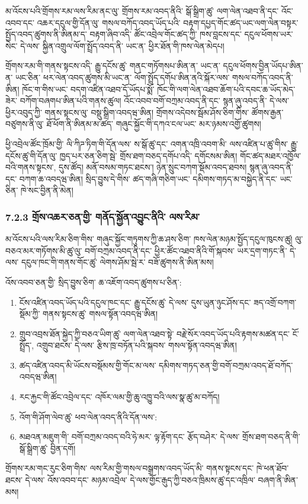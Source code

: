 \documentclass[11pt]{article}
\begin{document}
མ་འོངས་པའི་གྲོགས་རམ་ལས་རིམ་ནང་ལུ་ གྲོགས་རམ་འབད་ནིའི་ སྒོ་སྒྲིག་ཚུ་ ལག་ལེན་འཐབ་ནི་དང་ འོང་འབབ་དང་ འཆར་དངུལ་གྱི་དོན་ལུ་ གསལ་བཀོད་འབད་ཡོད་པའི་ བརྟག་དཔྱད་གོང་ཚད་ཡང་ལག་ལེན་བསྟར་སྤྱོད་འབད་ཚུགས་ནི་ཨིནམ་ད་ བརྟག་ཞིབ་འདི་ ཚོང་འབྲེལ་གོང་ཚད་ཀྱི་ ཁས་བླངས་དང་ དངུལ་ཕོགས་ཡར་སེང་ དེ་ལས་ སྐྱིན་འགྲུལ་ལོག་སྤྲོད་འབད་ནི་ ཡང་ན་ ཕྱིར་ཐོན་གི་ཁས་ལེན་མེདཔ།

གྲོགས་རམ་གི་གནས་སྟངས་འདི་ རྒྱུ་དངོས་ཚུ་ གནང་གཏོགསཔ་ཨིན་ན་ ཡང་ན་ དངུལ་ཕོགས་བྱིན་ཡོདཔ་ཨིན་ན་ ཡང་ཅིན་ ཕར་ལེན་འབད་ཚུགས་མི་ཡང་ན་ ལོག་སྤྲོད་དགོཔ་ཨིན་ནའི་སྐོར་ལས་ གསལ་བཀོད་འབད་ནི་ཨིན། ཁོང་ག་གིས་ཡང་ བདག་འཛིན་འཐབ་དོ་ཡོདཔ་སྨོ་ ཁོང་གི་ལག་ལེན་འཐབ་ཆོག་པའི་དབང་ཆ་ཡོད་མེད་ཟེར་ བཀོག་བཞགཔ་ཨིན་པའི་གནས་ཚུལ། འོང་འབབ་བགོ་བཀྲམ་འབད་ནི་དང་ སྙན་ཞུ་འབད་ནི་ དེ་ལས་ ཕྱིར་འབུད་ཀྱི་ གནས་སྟངས་ལུ་ བསྡུ་སྒྲིག་འབདཝ་ཨིན། གྲོགས་འདེབས་སྦོམ་ཤོས་ཅིག་གིས་ ཚོགས་རྒྱན་བཙུགས་ནི་ལུ་ ཐོ་ཕོག་ནི་ཨིནམ་མ་ཚད་ གཞུང་སྐྱོང་གི་དཀའ་ངལ་ཡང་ མར་ཉམས་འགྱོ་ཚུགས།

ཕྱི་འབྲེལ་ཚོང་ཁྲོམ་གྱི་ ལི་ཀིཌ་ཏིག་གི་དོན་ལས་ ས་སྒོ་ཚུ་དང་ འགན་འཁྲི་འབག་མི་ ལས་འཛིན་པ་ཚུ་གིས་ རྒྱུ་དངོས་ཚུ་གི་དོན་ལུ་ ཁྱད་པར་ཅན་ཅིག་སྦེ་ གྲོས་ཐག་བཅད་དགོཔ་འདི་ དགོངསམ་ཨིན། གོང་ཚད་མཐར་འཁྱོལ་བའི་གནས་སྟངས་, དུས་ཚོད། མནོ་བསམ་གཏང་ཐངས་། ཉེན་སྲུང་བཀག་སྡོམ་འབད་ཐབས། སྙན་ཞུ་འབད་ནི་དང་ བཀག་ཆ་འབདཝ་ཨིན། སྲིད་བྱུས་དེ་གིས་ ཚད་གཞི་གཅིག་ཡང་ དམིགས་གཏད་མ་བསྐྱེད་ནི་དང་ ཡང་ཅིན་ ཁེ་སང་བྱིན་ནི་མེན།

\subsubsection*{7.2.3 གྲོས་འཆར་ཅན་གྱི་ གནོད་སྐྱོན་འབྱུང་ནིའི་ ལས་རིམ་}

མ་འོངས་པའི་ལས་རིམ་ཅིག་གིས་ གཞུང་སྐྱོང་གཏུགས་ཀྱི་ཆ་ཤས་ཅིག་ ཁས་ལེན་མཉམ་སྤྱོད་དངུལ་ཁུངས་ཚུ། ལུ་བཅའ་མར་གཏོགས་མི་ཚུ་ལུ་ བགོ་བཀྲམ་འབད་ནི་དང་ ཕྱིར་ཚོང་འཐབ་ནིའི་གོ་སྐབས་ ཡར་དྲག་གཏང་ནི་ དེ་ལས་ དངུལ་ཁང་གི་གནས་གོང་ཚུ་ ལེགས་ཤོམ་སྦེ་ར་ བཟོ་ཚུགས་ནི་ཨིན་མས།

འོས་འབབ་ཅན་གྱི་ སྲིད་བྱུས་ཅིག་ ཆ་འཇོག་འབད་ཚུགས་པ་ཅིན་:

\begin{enumerate}[leftmargin=*]
\item ངོས་འཛིན་འབད་ཡོད་པའི་དངུལ་ཁང་དང་ རྒྱུ་དངོས་ཚུ་ དེ་ལས་ དུས་ཡུན་ཉུང་ཤོས་དང་ ཟད་འགྲོ་བཀག་སྡོམ་ཀྱི་ གནས་སྟངས་ཚུ་ གསལ་སྟོན་འབདཝ་ཨིན།
\item གྲུབ་འབྲས་ཐོན་སྐྱེད་ཀྱི་བཅའ་ཡིག་ཚུ་ ལག་ལེན་འཐབ་སྟེ་ བརྗེ་སོར་འབད་ཡོད་པའི་རྟགས་མཚན་དང་ ངོ་སྤྲོད་, འགྲུབ་ཐངས་ དེ་ལས་ རྩིས་ཁྲ་བཏོན་པའི་སྐབས་ གསལ་སྟོན་འབདཝ་ཨིན།
\item ཚད་འཛིན་འབད་མི་ཡོངས་བསྡོམས་གྱི་གོང་མ་ལས་ དམིགས་གཏད་ཅན་གྱི་བགོ་བཀྲམ་འབད་ཐོ་བཀོད་འབདཝ་ཨིན།
\item རང་རྐྱང་གི་ཚོང་འབྲེལ་དང་ འཁོར་ལམ་གྱི་ཆུ་འཁྱུ་བའི་ལས་སྣ་ཚུ་མ་བཀོད།
\item འོག་གི་ཤོག་ལེབ་ཚུ་ ཕབ་ལེན་འབད་ནིའི་དོན་ལས་:
\item མཐའན་མཇུག་གི་ བགོ་བཀྲམ་འབད་བའི་ཧེ་མར་ ལྟ་རྟོག་དང་ རྩོད་བཤེར་ དེ་ལས་ གྲོས་ཐག་བཅད་ནི་གི་ སྒོ་སྒྲིག་ཚུ་ བྱིན་དགོ།
\end{enumerate}
གྲོགས་རམ་གང་རུང་ཅིག་གིས་ ལས་རིམ་གྱི་གསལ་བསྒྲགས་འབད་ཡོད་མི་ གནས་སྟངས་དང་ ཁེ་ཕན་ཐོབ་ཐངས་ དེ་ལས་ འོས་འབབ་དང་ མཉམ་འབྲེལ་ དེ་ལས་གྱོང་རྒུད་ཀྱི་བཅའ་ཁྲིམས་ཚུ་དང་འཁྲིལ་ བཞག་ནི་ཨིན་མས།
\end{document}
